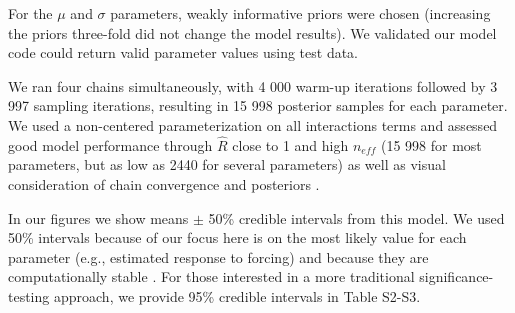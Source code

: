 \documentclass[11pt]{article}
\begin{document}
\noindent For the $\mu$ and $\sigma$ parameters, weakly informative priors were chosen (increasing the priors three-fold did not change the model results). We validated our model code could return valid parameter values using test data. 

We ran four chains simultaneously, with 4 000 warm-up iterations followed by 3 997 sampling iterations, resulting in 15 998 posterior samples for each parameter. We used a non-centered parameterization on all interactions terms and assessed good model performance through $\hat{R}$ close to 1 and high $n_{eff}$ (15 998 for most parameters, but as low as 2440 for several parameters) as well as visual consideration of chain convergence and posteriors \citep{BDA}. 

In our figures we show means $\pm$ 50\% credible intervals from this model. We used 50\% intervals because of our focus here is on the most likely value for each parameter (e.g., estimated response to forcing) and because they are computationally stable \citep{BDA,Carpenter:2016aa}. For those interested in a more traditional significance-testing approach, we provide 95\% credible intervals in Table S2-S3. 


\end{document}
